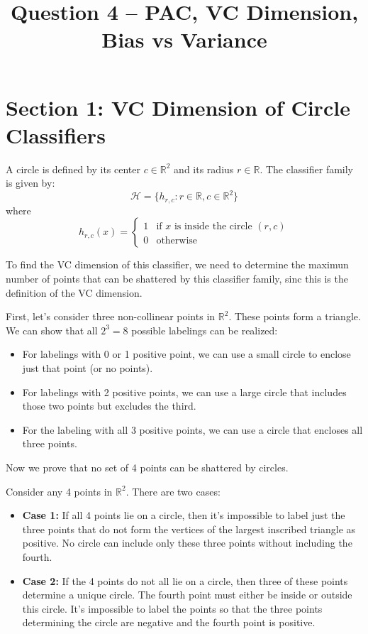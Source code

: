 \documentclass[a4paper, 12pt]{article}
\title{Question 4 – PAC, VC Dimension, Bias vs Variance}
\author{}
\date{}
\begin{document}
\maketitle

\section*{Section 1: VC Dimension of Circle Classifiers}
A circle is defined by its center $c \in \mathbb{R}^2$ and its radius $r \in \mathbb{R}$. The classifier family is given by:
\[
\mathcal{H} = \{ h_{r,c} : r \in \mathbb{R}, c \in \mathbb{R}^2 \}
\]
where
\[
h_{r,c}(x) = 
\begin{cases} 
1 & \text{if } x \text{ is inside the circle } (r,c) \\
0 & \text{otherwise} 
\end{cases}
\]

To find the VC dimension of this classifier, we need to determine the maximun number of points that can be shattered by this classifier family, sinc this is the definition of the VC dimension.

First, let's consider three non-collinear points in $\mathbb{R}^2$. These points form a triangle. We can show that all $2^3 = 8$ possible labelings can be realized:

\begin{itemize}
    \item For labelings with 0 or 1 positive point, we can use a small circle to enclose just that point (or no points).
    \item For labelings with 2 positive points, we can use a large circle that includes those two points but excludes the third.
    \item For the labeling with all 3 positive points, we can use a circle that encloses all three points.
\end{itemize}

Now we prove that no set of 4 points can be shattered by circles.

Consider any 4 points in $\mathbb{R}^2$. There are two cases:

\begin{itemize}
    \item \textbf{Case 1:} If all 4 points lie on a circle, then it's impossible to label just the three points that do not form the vertices of the largest inscribed triangle as positive. No circle can include only these three points without including the fourth.
    \item \textbf{Case 2:} If the 4 points do not all lie on a circle, then three of these points determine a unique circle. The fourth point must either be inside or outside this circle. It's impossible to label the points so that the three points determining the circle are negative and the fourth point is positive.
\end{itemize}
\end{document}
